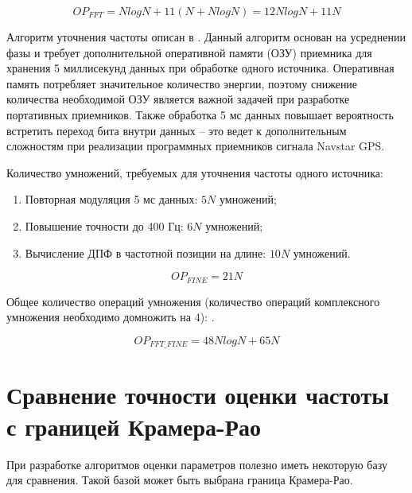 \begin{center}
\begin{equation}
	\label{eq:op_fft}
	OP_{FFT} = NlogN + 11(N + NlogN) = 12NlogN + 11N
\end{equation}
\end{center}

Алгоритм уточнения частоты описан в \cite{tsui}. Данный алгоритм основан на усреднении фазы и требует дополнительной оперативной памяти (ОЗУ) приемника для
хранения 5 миллисекунд данных при обработке одного источника. Оперативная память потребляет значительное количество энергии, поэтому снижение количества
необходимой ОЗУ является важной задачей при разработке портативных приемников. Также обработка 5 мс данных повышает вероятность встретить переход бита
внутри данных – это ведет к дополнительным сложностям при реализации программных приемников сигнала Navstar GPS.

Количество умножений, требуемых для уточнения частоты одного источника:
\begin{enumerate}
\item Повторная модуляция 5 мс данных: ${5N}$ умножений;
\item Повышение точности до 400 Гц: ${6N}$ умножений;
\item Вычисление ДПФ в частотной позиции на длине: ${10N}$ умножений.
\end{enumerate}

\begin{center}
\begin{equation}
	\label{eq:op_fine}
	OP_{FINE} = 21N
\end{equation}
\end{center}

Общее количество операций умножения (количество операций комплексного умножения необходимо домножить на 4):  .
\begin{center}
\begin{equation}
	\label{eq:op_fine_fft}
	OP_{FFT\_FINE} = 48NlogN + 65N
\end{equation}
\end{center}

\section{Сравнение точности оценки частоты с границей Крамера-Рао}
При разработке алгоритмов оценки параметров полезно иметь некоторую базу для сравнения. Такой базой может быть выбрана граница Крамера-Рао.

